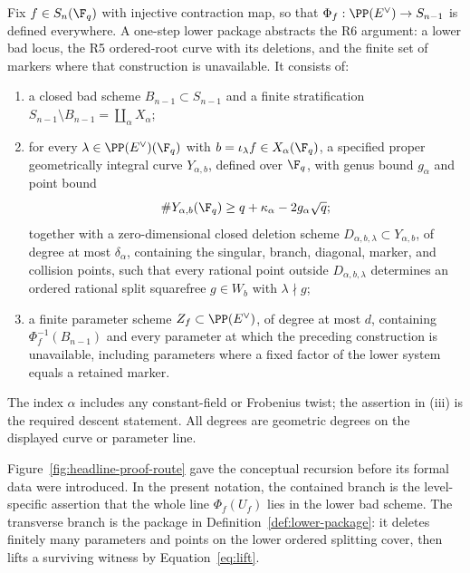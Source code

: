 \begin{definition}\label{def:lower-package}
Fix \(f\in S_n(\F_q)\) with injective contraction map, so that
\(\Phi_f:\PP(E^\vee)\to S_{n-1}\) is defined everywhere.  A one-step
lower package abstracts the R6 argument: a lower bad locus, the R5
ordered-root curve with its deletions, and the finite set of markers
where that construction is unavailable.  It consists of:
\begin{enumerate}[label=\textup{(\roman*)}]
\item a closed bad scheme \(B_{n-1}\subset S_{n-1}\) and a finite
  stratification \(S_{n-1}\setminus B_{n-1}=\coprod_\alpha X_\alpha\);
\item for every
  \(\lambda\in\PP(E^\vee)(\F_q)\) with
  \(b=\iota_\lambda f\in X_\alpha(\F_q)\), a specified proper
  geometrically integral curve \(Y_{\alpha,b}\), defined over
  \(\F_q\), with genus bound \(g_\alpha\) and point bound
  \[
       \#Y_{\alpha,b}(\F_q)\geq
       q+\kappa_\alpha-2g_\alpha\sqrt q;
  \]
  together with a zero-dimensional closed deletion scheme
  \(D_{\alpha,b,\lambda}\subset Y_{\alpha,b}\), of degree at most
  \(\delta_\alpha\), containing the singular, branch, diagonal,
  marker, and collision points, such that every
  rational point outside \(D_{\alpha,b,\lambda}\) determines an
  ordered rational split squarefree \(g\in W_b\) with
  \(\lambda\nmid g\);
\item a finite parameter scheme \(Z_f\subset\PP(E^\vee)\), of degree
  at most \(d\), containing
  \(\Phi_f^{-1}(B_{n-1})\) and every parameter at which the preceding
  construction is unavailable, including parameters where a fixed
  factor of the lower system equals a retained marker.
\end{enumerate}
The index \(\alpha\) includes any constant-field or Frobenius twist;
the assertion in (iii) is the required descent statement.  All degrees
are geometric degrees on the displayed curve or parameter line.
\end{definition}

Figure~\ref{fig:headline-proof-route} gave the conceptual recursion before its formal
data were introduced.  In the present notation, the contained branch is the
level-specific assertion that the whole line \(\Phi_f(U_f)\) lies in the
lower bad scheme.  The transverse branch is the package in
Definition~\ref{def:lower-package}: it deletes finitely many parameters and
points on the lower ordered splitting cover, then lifts a surviving witness
by Equation~\eqref{eq:lift}.

